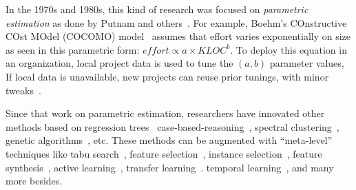 \documentclass{sig-alternate}
\begin{document}
In the 1970s and 1980s, this kind of research was focused on
{\em parametric estimation} as done 
by Putnam and
others~\cite{wol74,frei79,black77,herd77,watson77,boehm81}. For example, Boehm's
COnstructive COst MOdel (COCOMO)
model~\cite{boehm81} 
 assumes  that effort varies exponentially on size as seen in this parametric form:
$\mathit{effort} \propto \mathit{a \times KLOC}^b$. To deploy this equation in an organization,
local project data is used to tune the  $(a,b)$ parameter values, If local
data is unavailable, new projects can reuse prior tunings,  with  minor
tweaks~\cite{me04h}. 

 

  


Since that work on parametric estimation, researchers
have innovated other methods based on
regression
trees~\cite{shepperd97}
case-based-reasoning~\cite{shepperd97}, spectral
clustering~\cite{me12d}, genetic
algorithms~\cite{cordero97,burgess01}, etc.  These methods
can be augmented with  ``meta-level'' techniques like tabu search~\cite{cora10}, feature selection~\cite{chen05}, instance selection~\cite{koc11b},
feature synthesis~\cite{me12a}, active learning~\cite{me13a}, transfer learning~\cite{kocaguneli2014transfer}.
temporal learning~\cite{lokan09,minku14}, and many more besides.


 
\end{document}
